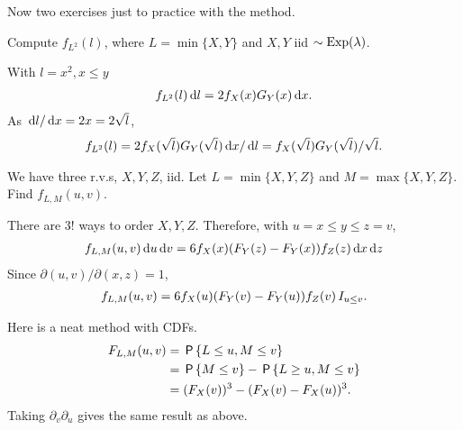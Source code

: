 \documentclass[a4paper,11pt]{article}
\begin{document}
Now two exercises just to practice with the method.

\begin{exercise}
Compute $f_{L^2}(l)$, where $L=\min\{X,Y\}$ and $X, Y$ iid $\sim \Exp{\lambda}$.
\begin{solution}
With $l = x^{2}, x\leq y$
\begin{align*}
f_{L^2}(l) \d l = 2f_{X}(x) G_{Y}(x) \d x.
\end{align*}
As $\d l/\d x = 2 x = 2 \sqrt l$,
\begin{align*}
f_{L^2}(l)  = 2f_{X}(\sqrt{l}) G_{Y}(\sqrt l ) \d x / \d l = f_{X}(\sqrt{l}) G_{Y}(\sqrt l ) /\sqrt l.
\end{align*}
\end{solution}

\end{exercise}


\begin{exercise}
We have three r.v.s, $X, Y, Z$, iid. Let $L=\min\{X, Y, Z\}$ and $M=\max\{X, Y, Z\}$. Find $f_{L,M}(u,v)$.
\begin{solution}
There are $3!$ ways to order $X, Y, Z$. Therefore, with $u=x \leq y \leq z = v$,
\begin{align*}
  f_{L,M}(u,v) \d u \d v= 6 f_{X}(x) (F_{Y}(z)-F_{Y}(x)) f_{Z}(z) \d x \d z
\end{align*}
Since $\partial(u,v)/\partial (x, z) = 1$,
\begin{align*}
  f_{L,M}(u,v) = 6 f_{X}(u) (F_{Y}(v)-F_{Y}(u)) f_{Z}(v)\1{u\leq v}.
\end{align*}

Here is a neat method with CDFs.
\begin{align*}
  F_{L,M}(u,v)
&= \P{L\leq u, M\leq v}\\
&= \P{M\leq v} - \P{L\geq u, M\leq v}\\
&= (F_{X}(v))^{3} - (F_{X}(v) - F_{X}(u))^{3}.
\end{align*}
Taking $\partial_{v}\partial_{u}$ gives the same result as above.
\end{solution}
\end{exercise}



\end{document}
